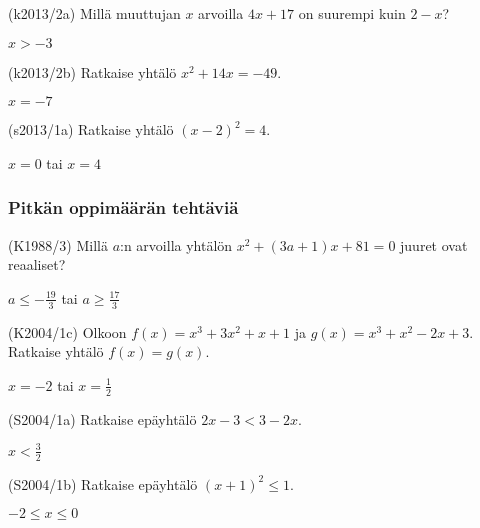 \begin{tehtava}
(k2013/2a) Millä muuttujan $x$ arvoilla $4x+17$ on suurempi kuin $2-x$?
\begin{vastaus}
$x>-3$
\end{vastaus}
\end{tehtava}

\begin{tehtava}
(k2013/2b) Ratkaise yhtälö $x^2+14x=-49$.
\begin{vastaus}
$x=-7$
\end{vastaus}
\end{tehtava}

\begin{tehtava}
(s2013/1a) Ratkaise yhtälö $(x-2)^2=4$.
\begin{vastaus}
$x=0$ tai $x=4$ 
\end{vastaus}
\end{tehtava}

\subsubsection*{Pitkän oppimäärän tehtäviä}

\begin{tehtava}
(K1988/3) Millä $a$:n arvoilla yhtälön $x^2+(3a+1)x+81=0$ juuret ovat reaaliset?
\begin{vastaus}
$a \leq -\frac{19}{3}$ tai $a \geq \frac{17}{3}$
\end{vastaus}
\end{tehtava}

\begin{tehtava}
(K2004/1c) Olkoon $f(x)=x^3+3x^2+x+1$ ja $g(x)=x^3+x^2-2x+3$. Ratkaise yhtälö $f(x)=g(x)$.
\begin{vastaus}
$x=-2$ tai $x=\frac{1}{2}$  
\end{vastaus}
\end{tehtava}

\begin{tehtava}
(S2004/1a) Ratkaise epäyhtälö $2x-3<3-2x$.
\begin{vastaus}
$x<\frac{3}{2}$ 
\end{vastaus}
\end{tehtava}

\begin{tehtava}
(S2004/1b) Ratkaise epäyhtälö $(x+1)^2 \leq 1$.
\begin{vastaus}
$-2 \leq x \leq 0$ 
\end{vastaus}
\end{tehtava}

